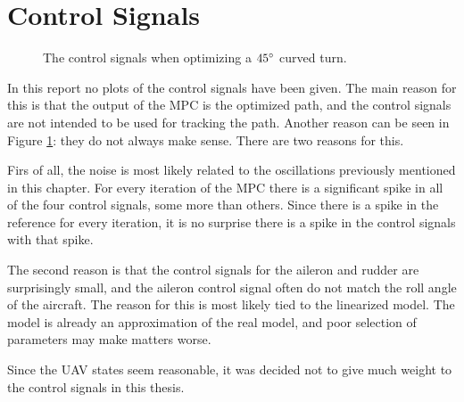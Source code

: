 \section{Control Signals}

\begin{figure}[]
	\centering
	\caption{The control signals when optimizing a $45\degree$ curved turn.}
	\label{fig:control_signals}
\end{figure}

In this report no plots of the control signals have been given. The main reason for this is that the output of the MPC is the optimized path, and the control signals are not intended to be used for tracking the path. Another reason can be seen in Figure \ref{fig:control_signals}: they do not always make sense. There are two reasons for this.

Firs of all, the noise is most likely related to the oscillations previously mentioned in this chapter. For every iteration of the MPC there is a significant spike in all of the four control signals, some more than others. Since there is a spike in the reference for every iteration, it is no surprise there is a spike in the control signals with that spike.

The second reason is that the control signals for the aileron and rudder are surprisingly small, and the aileron control signal often do not match the roll angle of the aircraft. The reason for this is most likely tied to the linearized model. The model is already an approximation of the real model, and poor selection of parameters may make matters worse.

Since the UAV states seem reasonable, it was decided not to give much weight to the control signals in this thesis. %